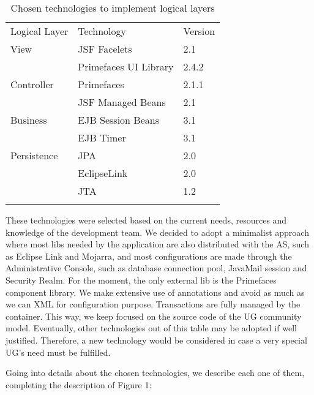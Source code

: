 \documentclass[envcountsame,envcountchap,letterpaper]{svmono}
\begin{document}
\begin{table}
\centering
\caption{Chosen technologies to implement logical layers}
\label{tab:chosen-technologies}
\begin{tabular}{lll}
\hline\noalign{\smallskip}
Logical Layer & Technology & Version \\
\noalign{\smallskip}\hline\noalign{\smallskip}
View & JSF Facelets & 2.1 \\
 & Primefaces UI Library & 2.4.2 \\
\noalign{\smallskip}
Controller & Primefaces & 2.1.1 \\
 & JSF Managed Beans & 2.1 \\
\noalign{\smallskip}
Business & EJB Session Beans & 3.1 \\
 & EJB Timer & 3.1 \\
\noalign{\smallskip}
Persistence & JPA & 2.0 \\
 & EclipseLink & 2.0 \\
 & JTA & 1.2 \\
\noalign{\smallskip}\hline
\end{tabular}
\end{table}

These technologies were selected based on the current needs, resources and knowledge of the development team. We decided to adopt a minimalist approach where most libs needed by the application are also distributed with the AS, such as Eclipse Link and Mojarra, and most configurations are made through the Administrative Console, such as database connection pool, JavaMail session and Security Realm. For the moment, the only external lib is the Primefaces component library. We make extensive use of annotations and avoid as much as we can XML for configuration purpose. Transactions are fully managed by the container. This way, we keep focused on the source code of the UG community model. Eventually, other technologies out of this table may be adopted if well justified. Therefore, a new technology would be considered in case a very special UG's need must be fulfilled.

Going into details about the chosen technologies, we describe each one of them, completing the description of Figure 1:
\end{document}
